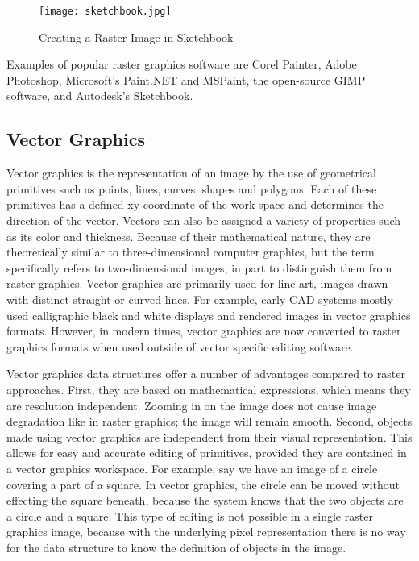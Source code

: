 \begin{figure}
\texttt{[image: sketchbook.jpg]}
\caption{Creating a Raster Image in Sketchbook}
\end{figure}



Examples of popular raster graphics software are Corel Painter, Adobe Photoshop, Microsoft's Paint.NET and MSPaint, the open-source GIMP software, and Autodesk's Sketchbook.

\subsection{Vector Graphics}

Vector graphics is the representation of an image by the use of geometrical primitives such as points, lines, curves, shapes and polygons.
Each of these primitives has a defined xy coordinate of the work space and determines the direction of the vector. 
Vectors can also be assigned a variety of properties such as its color and thickness.
Because of their mathematical nature, they are theoretically similar to three-dimensional computer graphics, but the term specifically refers to two-dimensional images; in part to distinguish them from raster graphics.
Vector graphics are primarily used for line art, images drawn with distinct straight or curved lines.
For example, early CAD systems mostly used calligraphic black and white displays and rendered images in vector graphics formats. However, in modern times, vector graphics are now converted to raster graphics formats when used outside of vector specific editing software.  

Vector graphics data structures offer a number of advantages compared to raster approaches. 
First, they are based on mathematical expressions, which means they are resolution independent.
Zooming in on the image does not cause image degradation like in raster graphics; the image will remain smooth. 
Second, objects made using vector graphics are independent from their visual representation.
This allows for easy and accurate editing of primitives, provided they are contained in a vector graphics workspace.
For example, say we have an image of a circle covering a part of a square. In vector graphics, the circle can be moved without effecting the square beneath, because the system knows that the two objects are a circle and a square.
This type of editing is not possible in a single raster graphics image, because with the underlying pixel representation there is no way for the data structure to know the definition of objects in the image.
 


